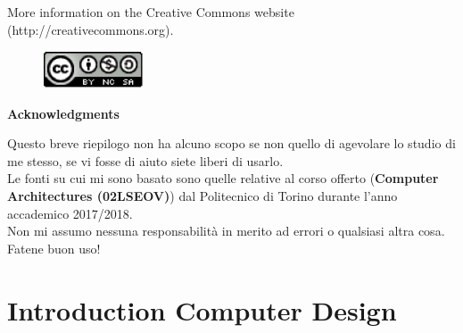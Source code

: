 \documentclass[12pt]{article}
\begin{document}
\noindent More information on the Creative Commons website (http://creativecommons.org).

\begin{figure}[h!]
  \centering
  \includegraphics[width=3cm]{images/license.png}
\end{figure}

{\noindent \Large \textbf{Acknowledgments}\bigskip}

Questo breve riepilogo non ha alcuno scopo se non quello di agevolare lo studio di me stesso, se vi fosse di aiuto siete liberi di usarlo.\\
Le fonti su cui mi sono basato sono quelle relative al corso offerto (\textbf{Computer Architectures (02LSEOV)}) dal Politecnico di Torino durante l'anno accademico 2017/2018.\\
Non mi assumo nessuna responsabilità in merito ad errori o qualsiasi altra cosa. Fatene buon uso!
\newpage

\section{Introduction Computer Design}
\end{document}
